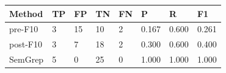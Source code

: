 \begin{tabular}{llllllll}
\hline
Method & TP & FP & TN & FN & P & R & F1 \\
\hline
pre-F10 & 3 & 15 & 10 & 2 & 0.167 & 0.600 & 0.261 \\
post-F10 & 3 & 7 & 18 & 2 & 0.300 & 0.600 & 0.400 \\
SemGrep & 5 & 0 & 25 & 0 & 1.000 & 1.000 & 1.000 \\
\hline
\end{tabular}
\caption{LexicalNoiseJava F10 results; regenerated Delta FPR 95\textbackslash\{\}\% CI is [-0.500, -0.154]}
